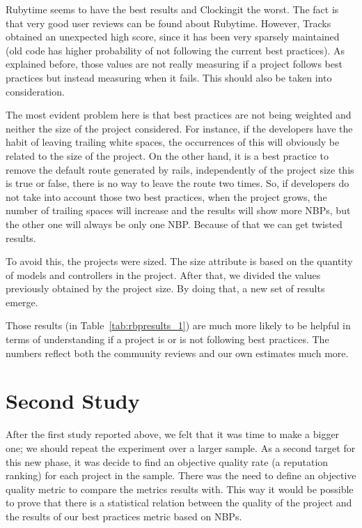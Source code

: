 

Rubytime seems to have the best results and Clockingit the worst. 
The fact is that very good user reviews can be found about Rubytime.
However, Tracks obtained an unexpected high score, since it has been very sparsely maintained 
(old code has higher probability of not following the current best practices).
As explained before, those values are not really measuring if a project follows best practices 
but instead measuring when it fails.
This should also be taken into consideration. 

The most evident problem here is that best practices are not being weighted and neither the size of the project considered.
For instance, if the developers have the habit of leaving trailing white spaces, 
the occurrences of this will obviously be related to the size of the project.
On the other hand, it is a best practice to remove the default route generated by rails, 
independently of the project size this is true or false, there is no way to leave the route two times. 
So, if developers do not take into account those two best practices, when the project grows, 
the number of trailing spaces will increase and the results will show more NBPs, 
but the other one will always be only one NBP.  
Because of that we can get twisted results.

To avoid this, the projects were sized.
The size attribute is based on the quantity of models and controllers in the project.
After that, we divided the values previously obtained  by the project size.
By doing that, a new set of results emerge.



Those results (in Table~\ref{tab:rbpresults_1}) are much more likely to be helpful in terms of understanding if a project is or is not following 
best practices.
The numbers reflect both the community reviews and our own estimates much more.


\section{Second Study}\label{subsec:second_study}
After the first study reported above, we felt that it was time to make a bigger one;
we should repeat the experiment over a larger sample. 
As a second target for this new phase, it was decide to find an objective quality rate (a reputation ranking) 
for each project in the sample.
There was the need to define an objective quality metric to compare the metrics results with.
This way it would be possible to prove that there is a statistical relation between the quality of the project
and the results of our best practices metric based on NBPs.


